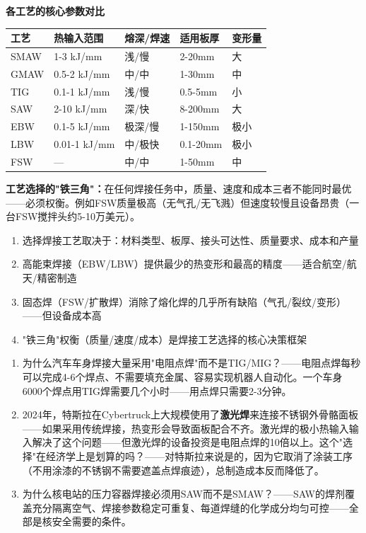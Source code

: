 \documentclass[a4paper,11pt]{ctexbook}
\newenvironment{quantitative}{\vspace{0.3cm}\noindent\begin{tcolorbox}[colback=quant!5!white,colframe=quant!60!black,title=\textcolor{quant}{\textbf{定量分析}}]\vspace{0.1cm}}{\end{tcolorbox}\vspace{0.3cm}}
\newenvironment{lessonsummary}{\vspace{0.3cm}\noindent\begin{tcolorbox}[colback=summarybg,colframe=green!50!black,title=\textbf{总结}]\vspace{0.1cm}}{\end{tcolorbox}\vspace{0.3cm}}
\newenvironment{discuss}{\vspace{0.3cm}\noindent\begin{tcolorbox}[colback=discussbg,colframe=orange!60!black,title=\textbf{讨论题}]\vspace{0.1cm}}{\end{tcolorbox}\vspace{0.3cm}}
\begin{document}
\begin{quantitative}
\textbf{各工艺的核心参数对比}

\begin{center}
\begin{tabular}{lllll}
\toprule
\textbf{工艺} & \textbf{热输入范围} & \textbf{熔深/焊速} & \textbf{适用板厚} & \textbf{变形量} \\
\midrule
SMAW & 1-3 kJ/mm & 浅/慢 & 2-20mm & 大 \\
GMAW & 0.5-2 kJ/mm & 中/中 & 1-30mm & 中 \\
TIG & 0.1-1 kJ/mm & 浅/慢 & 0.5-5mm & 小 \\
SAW & 2-10 kJ/mm & 深/快 & 8-200mm & 大 \\
EBW & 0.1-5 kJ/mm & 极深/慢 & 1-150mm & 极小 \\
LBW & 0.01-1 kJ/mm & 中/极快 & 0.1-20mm & 极小 \\
FSW & — & 中/中 & 1-50mm & 中 \\
\bottomrule
\end{tabular}
\end{center}

\textbf{工艺选择的"铁三角"：}在任何焊接任务中，质量、速度和成本三者不能同时最优——必须权衡。例如FSW质量极高（无气孔/无飞溅）但速度较慢且设备昂贵（一台FSW搅拌头约5-10万美元）。
\end{quantitative}

\begin{lessonsummary}
\begin{enumerate}
  \item 选择焊接工艺取决于：材料类型、板厚、接头可达性、质量要求、成本和产量
  \item 高能束焊接（EBW/LBW）提供最少的热变形和最高的精度——适合航空/航天/精密制造
  \item 固态焊（FSW/扩散焊）消除了熔化焊的几乎所有缺陷（气孔/裂纹/变形）——但设备成本高
  \item "铁三角"权衡（质量/速度/成本）是焊接工艺选择的核心决策框架
\end{enumerate}
\end{lessonsummary}

\begin{discuss}
\begin{enumerate}
  \item 为什么汽车车身焊接大量采用"电阻点焊"而不是TIG/MIG？——电阻点焊每秒可以完成4-6个焊点、不需要填充金属、容易实现机器人自动化。一个车身6000个焊点用TIG焊需要几个小时——用点焊只需要2-3分钟。
  \item 2024年，特斯拉在Cybertruck上大规模使用了\textbf{激光焊}来连接不锈钢外骨骼面板——如果采用传统焊接，热变形会导致面板配合不齐。激光焊的极小热输入输入解决了这个问题——但激光焊的设备投资是电阻点焊的10倍以上。这个"选择"在经济学上是划算的吗？——对特斯拉来说是的，因为它取消了涂装工序（不用涂漆的不锈钢不需要遮盖点焊痕迹），总制造成本反而降低了。
  \item 为什么核电站的压力容器焊接必须用SAW而不是SMAW？——SAW的焊剂覆盖充分隔离空气、焊接参数稳定可重复、每道焊缝的化学成分均匀可控——全部是核安全需要的条件。
\end{enumerate}
\end{discuss}
\end{document}
